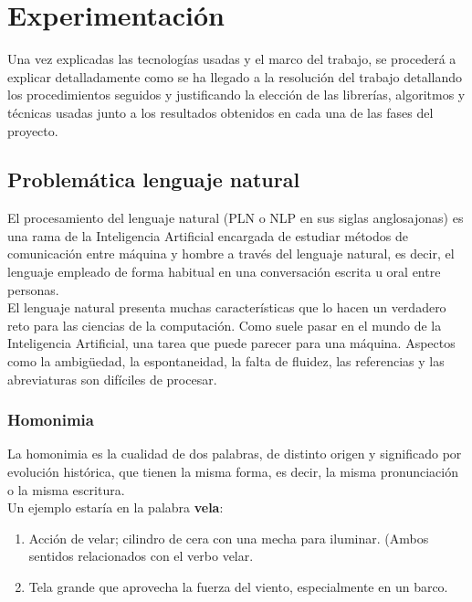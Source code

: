 \documentclass[../all.tex]{subfiles}
\begin{document}
\section{Experimentación} %
	Una vez explicadas las tecnologías usadas y el marco del trabajo, se procederá a explicar detalladamente como se ha llegado a la resolución del trabajo detallando los procedimientos seguidos y justificando la elección de las librerías, algoritmos y técnicas usadas junto a los resultados obtenidos en cada una de las fases del proyecto.


\subsection{Problemática lenguaje natural}
	El procesamiento del lenguaje natural (PLN o NLP en sus siglas anglosajonas) es una rama de la Inteligencia Artificial encargada de estudiar métodos de comunicación entre máquina y hombre a través del lenguaje natural, es decir, el lenguaje empleado de forma habitual en una conversación escrita u oral entre personas.\\ 
	
	El lenguaje natural presenta muchas características que lo hacen un verdadero reto para las ciencias de la computación. Como suele pasar en el mundo de la Inteligencia Artificial, una tarea que puede parecer para una máquina. Aspectos como la ambigüedad, la espontaneidad, la falta de fluidez, las referencias y las abreviaturas son difíciles de procesar.

\subsubsection{Homonimia}
	La homonimia  es la cualidad de dos palabras, de distinto origen y significado por evolución histórica, que tienen la misma forma, es decir, la misma pronunciación o la misma escritura.\\
	
	Un ejemplo estaría en la palabra \textbf{vela}:
	\begin{enumerate}[resume]
		\setcounter{enumi}{0}
		\item Acción de velar; cilindro de cera con una mecha para iluminar. (Ambos sentidos relacionados con el verbo velar.
		\item Tela grande que aprovecha la fuerza del viento, especialmente en un barco.
	\end{enumerate}
\end{document}
